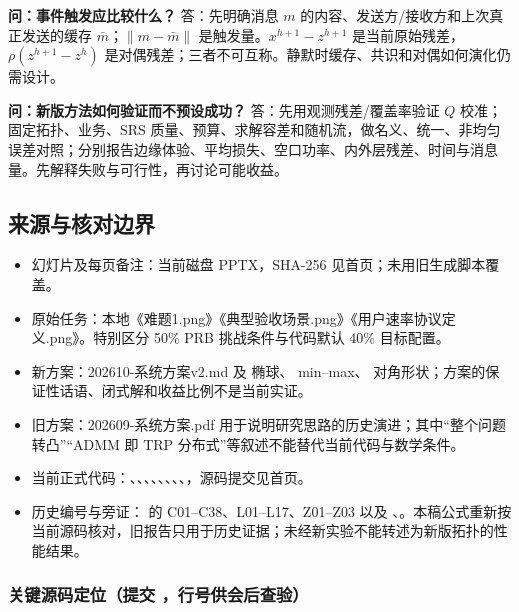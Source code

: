 \documentclass[11pt,a4paper]{ctexart}
\begin{document}
\textbf{问：事件触发应比较什么？} 答：先明确消息 $m$ 的内容、发送方/接收方和上次真正发送的缓存 $\bar m$；$\|m-\bar m\|$ 是触发量。$x^{h+1}-z^{h+1}$ 是当前原始残差，$\rho(z^{h+1}-z^h)$ 是对偶残差；三者不可互称。静默时缓存、共识和对偶如何演化仍需设计。\par

\textbf{问：新版方法如何验证而不预设成功？} 答：先用观测残差/覆盖率验证 $Q$ 校准；固定拓扑、业务、SRS 质量、预算、求解容差和随机流，做名义、统一、非均匀误差对照；分别报告边缘体验、平均损失、空口功率、内外层残差、时间与消息量。先解释失败与可行性，再讨论可能收益。\par

\subsection*{来源与核对边界}

\begin{itemize}[leftmargin=2em,itemsep=1pt]
\item 幻灯片及每页备注：当前磁盘 PPTX，SHA-256 见首页；未用旧生成脚本覆盖。
\item 原始任务：本地《难题1.png》《典型验收场景.png》《用户速率协议定义.png》。特别区分 50\% PRB 挑战条件与代码默认 40\% 目标配置。
\item 新方案：\textsf{202610-系统方案v2.md} 及  椭球、 min–max、 对角形状；方案的保证性话语、闭式解和收益比例不是当前实证。
\item 旧方案：\textsf{202609-系统方案.pdf} 用于说明研究思路的历史演进；其中“整个问题转凸”“ADMM 即 TRP 分布式”等叙述不能替代当前代码与数学条件。
\item 当前正式代码：、、、、、、、、，源码提交见首页。
\item 历史编号与旁证： 的 C01–C38、L01–L17、Z01–Z03 以及 、。本稿公式重新按当前源码核对，旧报告只用于历史证据；未经新实验不能转述为新版拓扑的性能结果。
\end{itemize}

\subsubsection*{关键源码定位（提交 ，行号供会后查验）}
\end{document}
